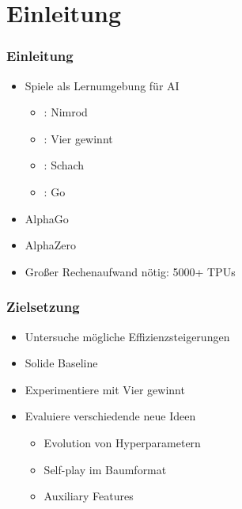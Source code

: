 


\section{Einleitung}



\begin{frame}
 \frametitle{Einleitung}
  


\begin{itemize}
  \item \pause Spiele als Lernumgebung für AI
\begin{itemize}
  \item {}: Nimrod
  \item {}: Vier gewinnt
  \item {}: Schach
  \item {}: Go
\end{itemize}
\end{itemize}

\begin{itemize}
  \item \pause AlphaGo
  \item \pause AlphaZero
  \item \pause Großer Rechenaufwand nötig: 5000+ TPUs
\end{itemize}

  
\end{frame}
\begin{frame}
 \frametitle{Zielsetzung}
  


\begin{itemize}
  \item \pause Untersuche mögliche Effizienzsteigerungen
  \item \pause Solide Baseline
  \item \pause Experimentiere mit Vier gewinnt
  \item \pause Evaluiere verschiedende neue Ideen
\begin{itemize}
  \item \pause Evolution von Hyperparametern
  \item \pause Self-play im Baumformat
  \item \pause Auxiliary Features
\end{itemize}
\end{itemize}

  
\end{frame}

